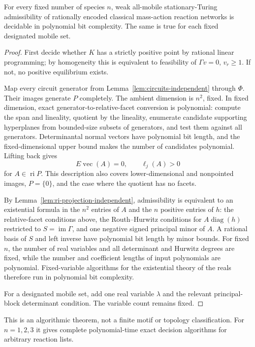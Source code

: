 \begin{theorem}
\label{thm:fixed-n-independent}
For every fixed number of species $n$, weak all-mobile stationary-Turing
admissibility of rationally encoded classical mass-action reaction networks is
decidable in polynomial bit complexity. The same is true for each fixed
designated mobile set.
\end{theorem}

\begin{proof}
First decide whether $K$ has a strictly positive point by rational linear
programming; by homogeneity this is equivalent to feasibility of
$\Gamma v=0$, $v_r\geq1$. If not, no positive equilibrium exists.

Map every circuit generator from Lemma~\ref{lem:circuits-independent} through
$\Phi$. Their images generate $P$ completely. The ambient dimension is
$n^2$, fixed. In fixed dimension, exact generator-to-relative-facet conversion
is polynomial: compute the span and lineality, quotient by the lineality,
enumerate candidate supporting hyperplanes from bounded-size subsets of
generators, and test them against all generators. Determinantal normal vectors
have polynomial bit length, and the fixed-dimensional upper bound makes the
number of candidates polynomial. Lifting back gives
\[
 E\operatorname{vec}(A)=0,\qquad \ell_j(A)>0
\]
for $A\in\operatorname{ri}P$. This description also covers lower-dimensional
and nonpointed images, $P=\{0\}$, and the case where the quotient has no
facets.

By Lemma~\ref{lem:ri-projection-independent}, admissibility is equivalent to
an existential formula in the $n^2$ entries of $A$ and the $n$ positive
entries of $h$: the relative-facet conditions above, the Routh--Hurwitz
conditions for $A\operatorname{diag}(h)$ restricted to
$S=\operatorname{im}\Gamma$, and one negative signed principal minor of $A$.
A rational basis of $S$ and left inverse have polynomial bit length by minor
bounds. For fixed $n$, the number of real variables and all determinant and
Hurwitz degrees are fixed, while the number and coefficient lengths of input
polynomials are polynomial. Fixed-variable algorithms for the existential
theory of the reals therefore run in polynomial bit complexity.

For a designated mobile set, add one real variable $\lambda$ and the relevant
principal-block determinant condition. The variable count remains fixed.
\end{proof}

This is an algorithmic theorem, not a finite motif or topology classification.
For $n=1,2,3$ it gives complete polynomial-time exact decision algorithms for
arbitrary reaction lists.
